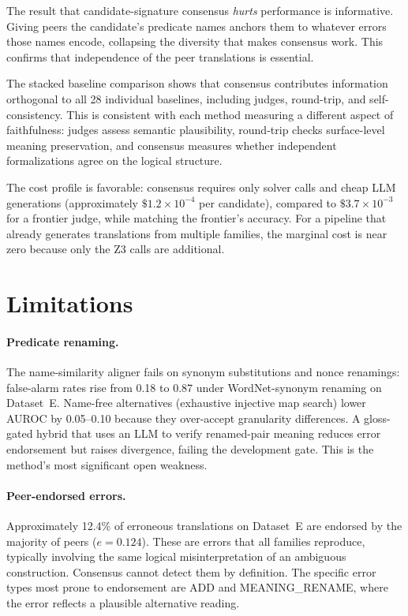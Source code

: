 \documentclass[11pt,letterpaper]{article}
\begin{document}
The result that candidate-signature consensus \emph{hurts} performance is informative. Giving peers the candidate's predicate names anchors them to whatever errors those names encode, collapsing the diversity that makes consensus work. This confirms that independence of the peer translations is essential.

The stacked baseline comparison shows that consensus contributes information orthogonal to all 28 individual baselines, including judges, round-trip, and self-consistency. This is consistent with each method measuring a different aspect of faithfulness: judges assess semantic plausibility, round-trip checks surface-level meaning preservation, and consensus measures whether independent formalizations agree on the logical structure.

The cost profile is favorable: consensus requires only solver calls and cheap LLM generations (approximately $\$1.2 \times 10^{-4}$ per candidate), compared to $\$3.7 \times 10^{-3}$ for a frontier judge, while matching the frontier's accuracy. For a pipeline that already generates translations from multiple families, the marginal cost is near zero because only the Z3 calls are additional.


\section{Limitations}
\label{sec:limitations}

\paragraph{Predicate renaming.}
The name-similarity aligner fails on synonym substitutions and nonce renamings: false-alarm rates rise from 0.18 to 0.87 under WordNet-synonym renaming on Dataset~E\@. Name-free alternatives (exhaustive injective map search) lower AUROC by 0.05--0.10 because they over-accept granularity differences. A gloss-gated hybrid that uses an LLM to verify renamed-pair meaning reduces error endorsement but raises divergence, failing the development gate. This is the method's most significant open weakness.

\paragraph{Peer-endorsed errors.}
Approximately 12.4\% of erroneous translations on Dataset~E are endorsed by the majority of peers ($e = 0.124$). These are errors that all families reproduce, typically involving the same logical misinterpretation of an ambiguous construction. Consensus cannot detect them by definition. The specific error types most prone to endorsement are ADD and MEANING\_RENAME, where the error reflects a plausible alternative reading.
\end{document}
